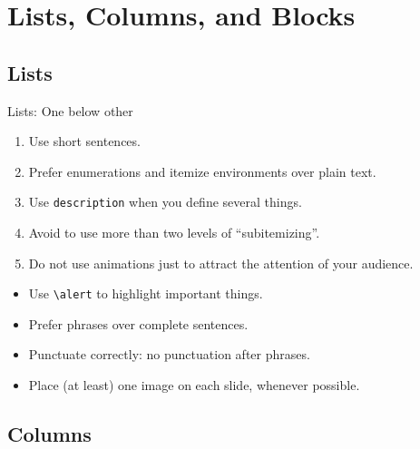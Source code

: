 \documentclass{beamer}
\begin{document}
\section{Lists, Columns, and Blocks}
\SectionPage

\subsection{Lists}

\begin{frame}[fragile]{Lists: One below other}	
	\begin{enumerate}\scriptsize
		\item  Use short sentences.
		\item  Prefer enumerations and itemize environments over plain text.
		\item  Use \verb|description|  when you define several things.
		\item  Avoid to use more than two levels of ``subitemizing''.
		\item  Do not use animations just to attract the attention of your audience. 
	\end{enumerate}
	
	\begin{itemize}\scriptsize
		\item   Use \verb|\alert| to highlight important things.
		\item   Prefer phrases over complete sentences.
		\item   Punctuate correctly: no punctuation after phrases.
		\item   Place (at least) one image on each slide, whenever possible.  
	\end{itemize}	
\end{frame}

\subsection{Columns}
\end{document}
